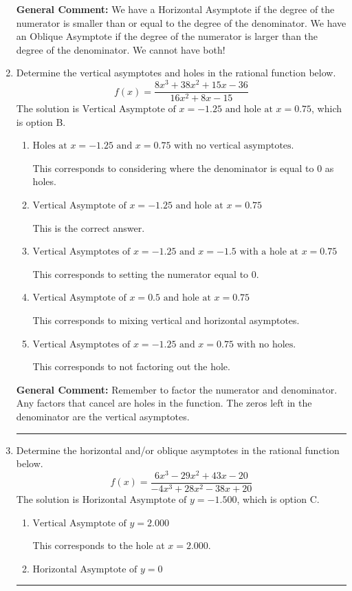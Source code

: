 \documentclass{extbook}[14pt]
\newcommand{\litem}[1]{\item #1

\rule{\textwidth}{0.4pt}}
\begin{document}
\begin{enumerate}
{\textbf{General Comment:} We have a Horizontal Asymptote if the degree of the numerator is smaller than or equal to the degree of the denominator. We have an Oblique Asymptote if the degree of the numerator is larger than the degree of the denominator. We cannot have both!
}
\litem{
Determine the vertical asymptotes and holes in the rational function below.
\[ f(x) = \frac{8x^{3} +38 x^{2} +15 x -36}{16x^{2} +8 x -15} \]The solution is \( \text{Vertical Asymptote of } x = -1.25 \text{ and hole at } x = 0.75 \), which is option B.\begin{enumerate}[label=\Alph*.]
\item \( \text{Holes at } x = -1.25 \text{ and } x = 0.75 \text{ with no vertical asymptotes.} \)

This corresponds to considering where the denominator is equal to 0 as holes.
\item \( \text{Vertical Asymptote of } x = -1.25 \text{ and hole at } x = 0.75 \)

This is the correct answer.
\item \( \text{Vertical Asymptotes of } x = -1.25 \text{ and } x = -1.5 \text{ with a hole at } x = 0.75 \)

This corresponds to setting the numerator equal to 0.
\item \( \text{Vertical Asymptote of } x = 0.5 \text{ and hole at } x = 0.75 \)

This corresponds to mixing vertical and horizontal asymptotes.
\item \( \text{Vertical Asymptotes of } x = -1.25 \text{ and } x = 0.75 \text{ with no holes.} \)

This corresponds to not factoring out the hole.
\end{enumerate}

\textbf{General Comment:} Remember to factor the numerator and denominator. Any factors that cancel are holes in the function. The zeros left in the denominator are the vertical asymptotes.
}
\litem{
Determine the horizontal and/or oblique asymptotes in the rational function below.
\[ f(x) = \frac{6x^{3} -29 x^{2} +43 x -20}{-4x^{3} +28 x^{2} -38 x + 20} \]The solution is \( \text{Horizontal Asymptote of } y = -1.500  \), which is option C.\begin{enumerate}[label=\Alph*.]
\item \( \text{Vertical Asymptote of } y = 2.000  \)

This corresponds to the hole at $x = 2.000$.
\item \( \text{Horizontal Asymptote of } y = 0  \)


\end{enumerate}}
\end{enumerate}
\end{document}
